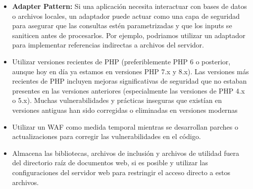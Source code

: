 \begin{itemize}
    \item \textbf{Adapter Pattern:} Si una aplicación necesita interactuar con bases de datos o archivos locales,  un adaptador puede actuar como una capa de seguridad para asegurar que las consultas estén parametrizadas y que los inputs se saniticen antes de procesarlos. Por ejemplo, podriamos utilizar un adaptador para implementar referencias indirectas a archivos del servidor.
    \item Utilizar versiones recientes de PHP (preferiblemente PHP 6 o posterior, aunque hoy en día ya estamos en versiones PHP 7.x y 8.x). Las versiones más recientes de PHP incluyen mejoras significativas de seguridad que no estaban presentes en las versiones anteriores (especialmente las versiones de PHP 4.x o 5.x). Muchas vulnerabilidades y prácticas inseguras que existían en versiones antiguas han sido corregidas o eliminadas en versiones modernas
    \item Utilizar un WAF como medida temporal mientras se desarrollan parches o actualizaciones para corregir las vulnerabilidades en el código.
    \item Almacena las bibliotecas, archivos de inclusión y archivos de utilidad fuera del directorio raíz de documentos web, si es posible y utilizar las configuraciones del servidor web para restringir el acceso directo a estos archivos.
\end{itemize}




